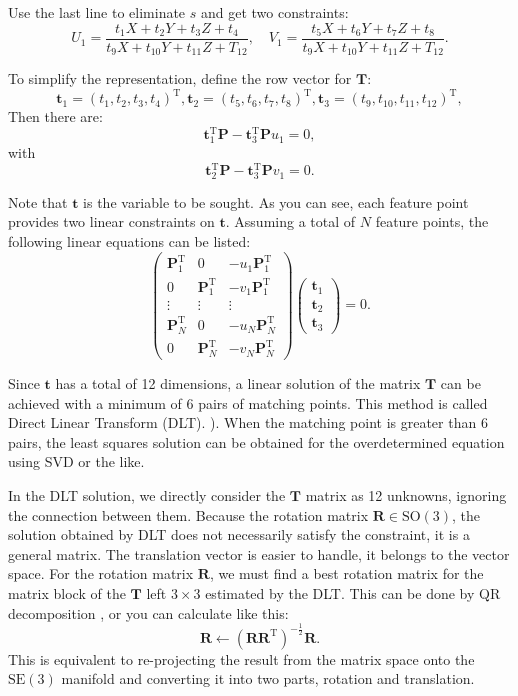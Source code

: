 Use the last line to eliminate $s$ and get two constraints:
\[
U_{1}=\frac{t_{1}X+t_{2}Y+t_{3}Z+t_{4}}{t_{9}X+t_{10}Y+t_{11}Z+ T_{12}},\quad
V_{1}=\frac{t_{5}X+t_{6}Y+t_{7}Z+t_{8}}{t_{9}X+t_{10}Y+t_{11}Z+ T_{12}}.
\]

To simplify the representation, define the row vector for $\bm{T}$:
\[
\bm{t}_{1}=(t_{1},t_{2},t_{3},t_{4})^\mathrm{T},
\bm{t}_{2}=(t_{5},t_{6},t_{7},t_{8})^\mathrm{T},
\bm{t}_{3}=(t_{9},t_{10},t_{11},t_{12})^\mathrm{T},
\]
Then there are:
\[
\bm{t}_1^\mathrm{T}\bm{P}-\bm{t}_3^\mathrm{T}\bm{P} u_1=0,
\]
with
\[
\bm{t}_2^\mathrm{T}\bm{P}-\bm{t}_3^\mathrm{T}\bm{P} v_1=0.
\]

Note that $\bm{t}$ is the variable to be sought. As you can see, each feature point provides two linear constraints on $\bm{t}$. Assuming a total of $N$ feature points, the following linear equations can be listed:
\begin{equation}
\begin{pmatrix}
\bm{P}_{1}^{\mathrm{T}} & 0 & -u_{1}\bm{P}_{1}^{\mathrm{T}} \\
0 & \bm{P}_{1}^{\mathrm{T}} & -v_{1}\bm{P}_{1}^{\mathrm{T}} \\
\vdots & \vdots & \vdots \\
\bm{P}_{N}^{\mathrm{T}} & 0 & -u_{N}\bm{P}_{N}^{\mathrm{T}} \\
0 & \bm{P}_{N}^{\mathrm{T}} & -v_{N}\bm{P}_{N}^{\mathrm{T}}
\end{pmatrix}
\begin{pmatrix}
\bm{t}_{1} \\ \bm{t}_{2} \\ \bm{t}_{3}
\end{pmatrix}
=0.
\end{equation}

Since $\bm{t}$ has a total of 12 dimensions, a linear solution of the matrix $\bm{T}$ can be achieved with a minimum of 6 pairs of matching points. This method is called Direct Linear Transform (DLT). ). When the matching point is greater than 6 pairs, the least squares solution can be obtained for the overdetermined equation using SVD or the like.

In the DLT solution, we directly consider the $\bm{T}$ matrix as 12 unknowns, ignoring the connection between them. Because the rotation matrix $\bm{R} \in \mathrm{SO}(3)$, the solution obtained by DLT does not necessarily satisfy the constraint, it is a general matrix. The translation vector is easier to handle, it belongs to the vector space. For the rotation matrix $\bm{R}$, we must find a best rotation matrix for the matrix block of the $\bm{T}$ left $3 \times 3$ estimated by the DLT. This can be done by QR decomposition \textsuperscript{\cite{Hartley2003, Chen1994}}, or you can calculate \textsuperscript{\cite{Barfoot2016, Green1952}} like this:
\begin{equation}
\bm{R} \leftarrow {\left( {\bm{R}{\bm{R}^\mathrm{T}}} \right)^{ - \frac{1}{2}}} \bm{ R}.
\end{equation}
This is equivalent to re-projecting the result from the matrix space onto the $\mathrm{SE}(3)$ manifold and converting it into two parts, rotation and translation.

